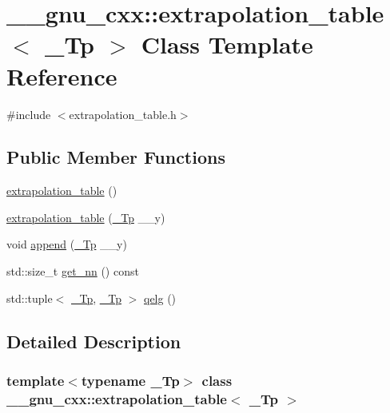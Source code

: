 \hypertarget{class____gnu__cxx_1_1extrapolation__table}{}\section{\+\_\+\+\_\+gnu\+\_\+cxx\+:\+:extrapolation\+\_\+table$<$ \+\_\+\+Tp $>$ Class Template Reference}
\label{class____gnu__cxx_1_1extrapolation__table}


{\ttfamily \#include $<$extrapolation\+\_\+table.\+h$>$}

\subsection*{Public Member Functions}
\begin{DoxyCompactItemize}
\item 
\hyperlink{class____gnu__cxx_1_1extrapolation__table_a7769d0bb61a2b5b0153140d707b2d3a0}{extrapolation\+\_\+table} ()
\item 
\hyperlink{class____gnu__cxx_1_1extrapolation__table_a9866afc5e42c63b300e21620ad8adac2}{extrapolation\+\_\+table} (\hyperlink{namespace____gnu__cxx_a3b19a9c800ca194374ef9172290f7d79}{\+\_\+\+Tp} \+\_\+\+\_\+y)
\item 
void \hyperlink{class____gnu__cxx_1_1extrapolation__table_a0a20b6d8a3c194a962ce6f1bba96f5e9}{append} (\hyperlink{namespace____gnu__cxx_a3b19a9c800ca194374ef9172290f7d79}{\+\_\+\+Tp} \+\_\+\+\_\+y)
\item 
std\+::size\+\_\+t \hyperlink{class____gnu__cxx_1_1extrapolation__table_a4948ba62ca85ddecc2b530096b368908}{get\+\_\+nn} () const
\item 
std\+::tuple$<$ \hyperlink{namespace____gnu__cxx_a3b19a9c800ca194374ef9172290f7d79}{\+\_\+\+Tp}, \hyperlink{namespace____gnu__cxx_a3b19a9c800ca194374ef9172290f7d79}{\+\_\+\+Tp} $>$ \hyperlink{class____gnu__cxx_1_1extrapolation__table_a8bacdbca35a9df35185102710380a8ec}{qelg} ()
\end{DoxyCompactItemize}


\subsection{Detailed Description}
\subsubsection*{template$<$typename \+\_\+\+Tp$>$\newline
class \+\_\+\+\_\+gnu\+\_\+cxx\+::extrapolation\+\_\+table$<$ \+\_\+\+Tp $>$}



